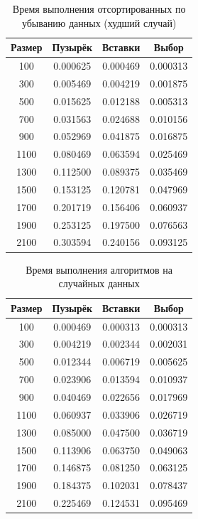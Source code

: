 \documentclass[12pt]{report}
\begin{document}
	\begin{table} [h!]
		\caption{Время выполнения отсортированных по убыванию данных (худший случай)}
		\begin{center}
			\begin{tabular}{|c c c c|}
				\hline
				Размер & Пузырёк & Вставки  & Выбор \\
				\hline
				100 & 0.000625 & 0.000469 & 0.000313 \\ 
				\hline 
				300 & 0.005469 & 0.004219 & 0.001875 \\ 
				\hline 
				500 & 0.015625 & 0.012188 & 0.005313 \\ 
				\hline 
				700 & 0.031563 & 0.024688 & 0.010156 \\ 
				\hline 
				900 & 0.052969 & 0.041875 & 0.016875 \\ 
				\hline 
				1100 & 0.080469 & 0.063594 & 0.025469 \\ 
				\hline 
				1300 & 0.112500 & 0.089375 & 0.035469 \\ 
				\hline 
				1500 & 0.153125 & 0.120781 & 0.047969 \\ 
				\hline 
				1700 & 0.201719 & 0.156406 & 0.060937 \\ 
				\hline 
				1900 & 0.253125 & 0.197500 & 0.076563 \\ 
				\hline 
				2100 & 0.303594 & 0.240156 & 0.093125 \\ 
				\hline 
			\end{tabular}
		\end{center}
	\end{table}

	\begin{table} [h!]
		\caption{Время выполнения алгоритмов на случайных данных}
		\begin{center}
			\begin{tabular}{|c c c c|}
				\hline
				Размер & Пузырёк & Вставки  & Выбор \\
				\hline
				100 & 0.000469 & 0.000313 & 0.000313 \\ 
				\hline 
				300 & 0.004219 & 0.002344 & 0.002031 \\ 
				\hline 
				500 & 0.012344 & 0.006719 & 0.005625 \\ 
				\hline 
				700 & 0.023906 & 0.013594 & 0.010937 \\ 
				\hline 
				900 & 0.040469 & 0.022656 & 0.017969 \\ 
				\hline 
				1100 & 0.060937 & 0.033906 & 0.026719 \\ 
				\hline 
				1300 & 0.085000 & 0.047500 & 0.036719 \\ 
				\hline 
				1500 & 0.113906 & 0.063750 & 0.049063 \\ 
				\hline 
				1700 & 0.146875 & 0.081250 & 0.063125 \\ 
				\hline 
				1900 & 0.184375 & 0.102031 & 0.078437 \\ 
				\hline 
				2100 & 0.225469 & 0.124531 & 0.095469 \\ 
				\hline 
			\end{tabular}
		\end{center}
	\end{table}
\end{document}
